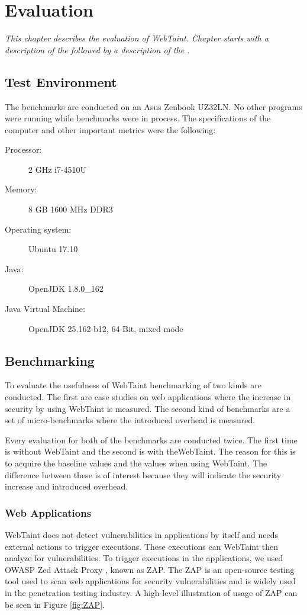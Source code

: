 \chapter{Evaluation}
\label{Evaluation}
\textit{This chapter describes the evaluation of WebTaint. Chapter starts with a description of the \textit{} followed by a description of the \textit{}.}



\section{Test Environment}
\label{TestEnvironment}
The benchmarks are conducted on an Asus Zenbook UZ32LN. No other programs were running while benchmarks were in process. The specifications of the computer and other important metrics were the following:

\begin{description}
    \item [Processor:] 2 GHz i7-4510U
    \item [Memory:] 8 GB 1600 MHz DDR3
    \item [Operating system:] Ubuntu 17.10
    \item [Java:] OpenJDK 1.8.0\_162
    \item [Java Virtual Machine:] OpenJDK 25.162-b12, 64-Bit, mixed mode
\end{description}



\section{Benchmarking}
\label{Benchmarking}
To evaluate the usefulness of WebTaint benchmarking of two kinds are conducted. The first are case studies on web applications where the increase in security by using WebTaint is measured. The second kind of benchmarks are a set of micro-benchmarks where the introduced overhead is measured.

Every evaluation for both of the benchmarks are conducted twice. The first time is without WebTaint and the second is with theWebTaint. The reason for this is to acquire the baseline values and the values when using WebTaint. The difference between these is of interest because they will indicate the security increase and introduced overhead.



\subsection{Web Applications}
WebTaint does not detect vulnerabilities in applications by itself and needs external actions to trigger executions. These executions can WebTaint then analyze for vulnerabilities. To trigger executions in the applications, we used OWASP Zed Attack Proxy \parencite{zap}, known as ZAP. The ZAP is an open-source testing tool used to scan web applications for security vulnerabilities and is widely used in the penetration testing industry. A high-level illustration of usage of ZAP can be seen in Figure \ref{fig:ZAP}. 

